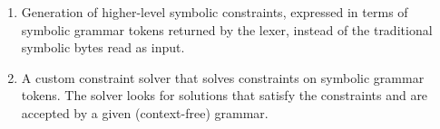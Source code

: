 \begin{enumerate}
\item Generation of higher-level symbolic constraints, expressed in terms of symbolic grammar tokens returned by the
lexer, instead of the traditional~\cite{dart,exe,fuzzing} symbolic bytes read as input.
	
\item A custom constraint solver that solves constraints on symbolic grammar tokens. The solver looks for solutions
that satisfy the constraints and are accepted by a given (context-free) grammar.
\end{enumerate}


